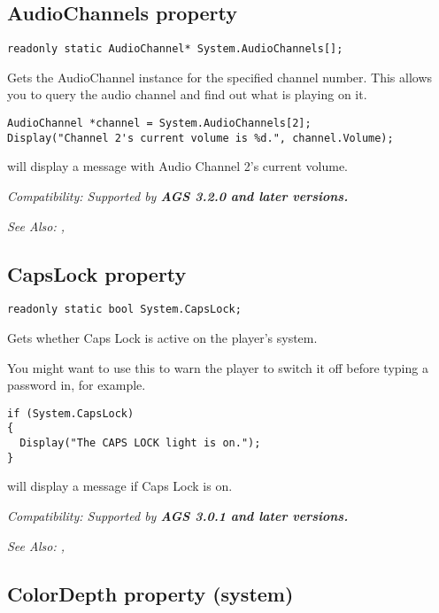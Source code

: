 \subsection{AudioChannels property}\label{System.AudioChannels}%

\begin{verbatim}
readonly static AudioChannel* System.AudioChannels[];
\end{verbatim}
Gets the AudioChannel instance for the specified channel number. This allows you
to query the audio channel and find out what is playing on it.

\begin{verbatim}
AudioChannel *channel = System.AudioChannels[2];
Display("Channel 2's current volume is %d.", channel.Volume);
\end{verbatim}
will display a message with Audio Channel 2's current volume.

\it{Compatibility:} Supported by \bf{AGS 3.2.0} and later versions.

\it{See Also:} ,


\subsection{CapsLock property}\label{System.CapsLock}%

\begin{verbatim}
readonly static bool System.CapsLock;
\end{verbatim}
Gets whether Caps Lock is active on the player's system.

You might want to use this to warn the player to switch it off before typing
a password in, for example.

\begin{verbatim}
if (System.CapsLock)
{
  Display("The CAPS LOCK light is on.");
}
\end{verbatim}
will display a message if Caps Lock is on.

\it{Compatibility:} Supported by \bf{AGS 3.0.1} and later versions.

\it{See Also:} ,


\subsection{ColorDepth property (system)}\label{System.ColorDepth}%

